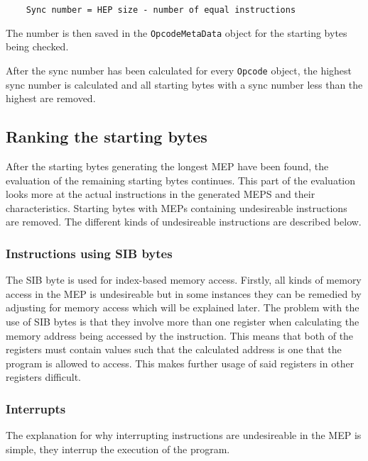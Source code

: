 \documentclass[11pt,twoside]{eitExjobb}
\begin{document}
\begin{verbatim}
    Sync number = HEP size - number of equal instructions
\end{verbatim}

The number is then saved in the \texttt{OpcodeMetaData} object for the starting bytes being checked.

After the sync number has been calculated for every \texttt{Opcode} object, the highest sync number is calculated and all starting bytes with a sync number less than the highest are removed.


\subsection{Ranking the starting bytes}
After the starting bytes generating the longest MEP have been found, the evaluation of the remaining starting bytes continues. This part of the evaluation looks more at the actual instructions in the generated MEPS and their characteristics. Starting bytes with MEPs containing undesireable instructions are removed. The different kinds of undesireable instructions are described below.

\subsubsection{Instructions using SIB bytes}
The SIB byte is used for index-based memory access. Firstly, all kinds of memory access in the MEP is undesireable but in some instances they can be remedied by adjusting for memory access which will be explained later. The problem with the use of SIB bytes is that they involve more than one register when calculating the memory address being accessed by the instruction. This means that both of the registers must contain values such that the calculated address is one that the program is allowed to access. This makes further usage of said registers in other registers difficult.

\subsubsection{Interrupts}
The explanation for why interrupting instructions are undesireable in the MEP is simple, they interrup the execution of the program. \\




\end{document}
